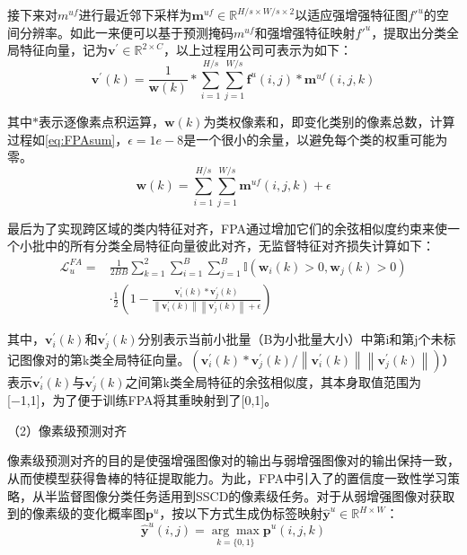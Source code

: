 \documentclass[lang=chs, degree=master, blindreview=false, adobe=false]{yanputhesis}
\begin{document}
接下来对$m^{u f}$进行最近邻下采样为$\mathbf{m}^{u f} \in \mathbb{R}^{H / s \times W / s \times 2}$以适应强增强特征图$f'^u$的空间分辨率。如此一来便可以基于预测掩码$m^{u f}$和强增强特征映射$f'^u$，提取出分类全局特征向量，记为$\mathbf{v}^{\prime} \in \mathbb{R}^{2 \times C}$，以上过程用公司可表示为如下：
\begin{equation}
  \label{eq:FPAmetafeat}
  \mathbf{v}^{\prime}(k)=\frac{1}{\boldsymbol{w}(k)} * \sum_{i=1}^{H / s} \sum_{j=1}^{W / s} \mathbf{f}^{u}(i, j) * \mathbf{m}^{u f}(i, j, k)
\end{equation}

其中$*$表示逐像素点积运算，$\boldsymbol{w}(k)$为类权像素和，即变化类别的像素总数，计算过程如\ref{eq:FPAsum}，$\epsilon = 1e-8$是一个很小的余量，以避免每个类的权重可能为零。
\begin{equation}
  \label{eq:FPAsum}
\boldsymbol{w}(k)=\sum_{i=1}^{H / s} \sum_{j=1}^{W / s} \mathbf{m}^{u f}(i, j, k)+\epsilon
\end{equation}

最后为了实现跨区域的类内特征对齐，FPA通过增加它们的余弦相似度约束来使一个小批中的所有分类全局特征向量彼此对齐，无监督特征对齐损失计算如下：
\begin{equation}
  \label{eq:FPALossf}
  \begin{aligned}
    \mathcal{L}_{u}^{F A}= & \frac{1}{2 B B} \sum_{k=1}^{2} \sum_{i=1}^{B} \sum_{j=1}^{B} \mathbb{I}\left(\boldsymbol{w}_{i}(k)>0, \boldsymbol{w}_{j}(k)>0\right) \\
    & \cdot \frac{1}{2}\left(1-\frac{\mathbf{v}_{i}^{\prime}(k) * \mathbf{v}_{j}^{\prime}(k)}{\left\|\mathbf{v}_{i}^{\prime}(k)\right\|\left\|\mathbf{v}_{j}^{\prime}(k)\right\|+\epsilon}\right)
    \end{aligned}
\end{equation}

其中，$\mathbf{v}_{i}^{\prime}(k)$和$\mathbf{v}_{j}^{\prime}(k)$分别表示当前小批量（B为小批量大小）中第i和第j个未标记图像对的第k类全局特征向量。$\left(\mathbf{v}_{i}^{\prime}(k) * \mathbf{v}_{j}^{\prime}(k) /\left\|\mathbf{v}_{i}^{\prime}(k)\right\|\left\|\mathbf{v}_{j}^{\prime}(k)\right\|\right)）$表示$\mathbf{v}_{i}^{\prime}(k)$与$\mathbf{v}_{j}^{\prime}(k)$之间第k类全局特征的余弦相似度，其本身取值范围为[−1,1]，为了便于训练FPA将其重映射到了[0,1]。

（2）像素级预测对齐

像素级预测对齐的目的是使强增强图像对的输出与弱增强图像对的输出保持一致，从而使模型获得鲁棒的特征提取能力。为此，FPA中引入了\cite{sohn2020fixmatch}的置信度一致性学习策略，从半监督图像分类任务适用到SSCD的像素级任务。对于从弱增强图像对获取到的像素级的变化概率图$\mathbf{p}^{u}$，按以下方式生成伪标签映射$\hat{\mathbf{y}}^{u} \in \mathbb{R}^{H \times W}$：
\begin{equation}
  \label{eq:FPApesudo}
  \hat{\mathbf{y}}^{u}(i, j)=\underset{k=\{0,1\}}{\arg \max } \mathbf{p}^{u}(i, j, k)
\end{equation}
\end{document}
